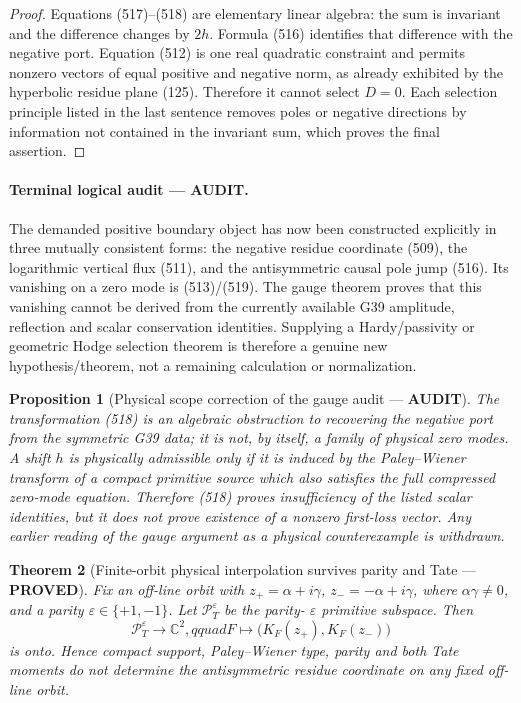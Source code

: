 \documentclass[11pt]{article}
\newtheorem{theorem}{Theorem}
\newtheorem{proposition}[theorem]{Proposition}
\newcommand{\PROVED}{\textcolor{green!45!black}{\textbf{PROVED}}}
\newcommand{\AUDIT}{\textcolor{orange!75!black}{\textbf{AUDIT}}}
\begin{document}
\begin{proof}
Equations (517)--(518) are elementary linear algebra: the sum is invariant
and the difference changes by \(2h\).  Formula (516) identifies that
difference with the negative port.  Equation (512) is one real quadratic
constraint and permits nonzero vectors of equal positive and negative norm,
as already exhibited by the hyperbolic residue plane (125).  Therefore it
cannot select \(D=0\).  Each selection principle listed in the last
sentence removes poles or negative directions by information not contained
in the invariant sum, which proves the final assertion.
\end{proof}

\paragraph{Terminal logical audit --- \AUDIT.}
The demanded positive boundary object has now been constructed explicitly
in three mutually consistent forms: the negative residue coordinate (509),
the logarithmic vertical flux (511), and the antisymmetric causal pole jump
(516).  Its vanishing on a zero mode is (513)/(519).  The gauge theorem
proves that this vanishing cannot be derived from the currently available
G39 amplitude, reflection and scalar conservation identities.  Supplying a
Hardy/passivity or geometric Hodge selection theorem is therefore a genuine
new hypothesis/theorem, not a remaining calculation or normalization.

\begin{proposition}[Physical scope correction of the gauge audit ---
\AUDIT]
The transformation (518) is an algebraic obstruction to recovering the
negative port from the symmetric G39 data; it is not, by itself, a family
of physical zero modes.  A shift \(h\) is physically admissible only if it
is induced by the Paley--Wiener transform of a compact primitive source
which also satisfies the full compressed zero-mode equation.  Therefore
(518) proves insufficiency of the listed scalar identities, but it does not
prove existence of a nonzero first-loss vector.  Any earlier reading of
the gauge argument as a physical counterexample is withdrawn.
\end{proposition}

\begin{theorem}[Finite-orbit physical interpolation survives parity and
Tate --- \PROVED]
Fix an off-line orbit with
\(z_+=\alpha+i\gamma\), \(z_-=-\alpha+i\gamma\), where
\(\alpha\gamma\ne0\), and a parity
\(\varepsilon\in\{+1,-1\}\).  Let
\(\mathcal P_T^\varepsilon\) be the parity-
\(\varepsilon\) primitive subspace.  Then
\begin{equation}
 \mathcal P_T^\varepsilon\longrightarrow\mathbb C^2,qquad
 F\longmapsto\bigl(K_F(z_+),K_F(z_-)\bigr)                 \tag{520}
\end{equation}
is onto.  Hence compact support, Paley--Wiener type, parity and both Tate
moments do not determine the antisymmetric residue coordinate on any fixed
off-line orbit.
\end{theorem}
\end{document}
